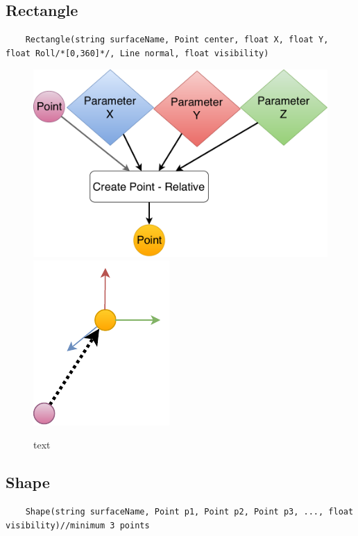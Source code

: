 \subsection{Rectangle}
\begin{lstlisting}
	Rectangle(string surfaceName, Point center, float X, float Y, float Roll/*[0,360]*/, Line normal, float visibility)
\end{lstlisting}
\begin{figure}[H]
	\centering
	\includegraphics[height=0.3\textwidth]{obrazky-figures/Diagram/DP Navrh operacii-0D - Point2.pdf}
	\includegraphics[height=0.3\textwidth]{obrazky-figures/Diagram/Draw/1Points/DP Navrh operacii-0D - PointRelative.pdf}
	\caption{text}
	\label{fig:1}
\end{figure}


\subsection{Shape}
\begin{lstlisting}
	Shape(string surfaceName, Point p1, Point p2, Point p3, ..., float visibility)//minimum 3 points
\end{lstlisting} 

